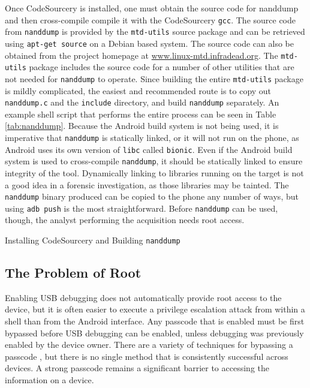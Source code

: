 Once CodeSourcery is installed, one must obtain the source code for nanddump and then cross-compile compile it with the CodeSourcery
\texttt{gcc}.  The source code from \texttt{nanddump} is provided by the \texttt{mtd-utils} source package and can be retrieved
using \texttt{apt-get source} on a Debian based system.  The source code can also be obtained from the project homepage at
\url{www.linux-mtd.infradead.org}.  The \texttt{mtd-utils} package includes the source code for a number of other utilities that
are not needed for \texttt{nanddump} to operate.  Since building the entire \texttt{mtd-utils} package is mildly complicated, the
easiest and recommended route is to copy out \texttt{nanddump.c} and the \texttt{include} directory, and build \texttt{nanddump}
separately.  An example shell script that performs the entire process can be seen in Table \ref{tab:nanddump}.  Because the Android
build system is not being used, it is imperative that \texttt{nanddump} is statically linked, or it will not run on the phone, as
Android uses its own version of \texttt{libc} called \texttt{bionic}.  Even if the Android build system is used to cross-compile
\texttt{nanddump}, it should be statically linked to ensure integrity of the tool.  Dynamically linking to libraries running on the
target is not a good idea in a forensic investigation, as those libraries may be tainted.  The \texttt{nanddump} binary produced can
be copied to the phone any number of ways, but using \texttt{adb push} is the most straightforward.  Before \texttt{nanddump} can be
used, though, the analyst performing the acquisition needs root access.

\begin{table}[htb]

\caption{Installing CodeSourcery and Building \texttt{nanddump}}
\label{tab:nanddump}
\end{table}

\subsection{The Problem of Root}
Enabling USB debugging does not automatically provide root access to the device, but it is
often easier to execute a privilege escalation attack from within a shell than from the Android interface. Any passcode that is
enabled must be first bypassed before USB debugging can be enabled, unless debugging was previously enabled by the device owner.
There are a variety of techniques for bypassing a passcode \cite{hoog, lockscreenbypass0, lockscreenbypass1, lockscreenbypass2}, but
there is no single method that is consistently successful across devices.  A strong passcode remains a significant barrier to
accessing the information on a device.

